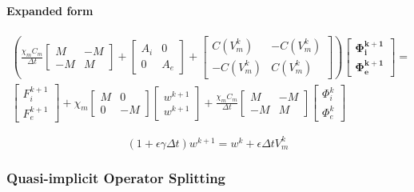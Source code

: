 \documentclass[a4paper]{article}
\begin{document}
\paragraph{Expanded form}
\begin{equation}
\begin{gathered}
\left( \frac{\chi_m C_m}{\Delta t} \begin{bmatrix} M & -M \\ -M & M \end{bmatrix} + \begin{bmatrix} A_i & 0 \\ 0 & A_e \end{bmatrix} + 
\begin{bmatrix}
C(V_m^k) & -C(V_m^k) \\ -C(V_m^k) & C(V_m^k)
\end{bmatrix}\right)
\begin{bmatrix} \bm{\Phi_i^{k+1}} \\ \bm{\Phi_e^{k+1}} \end{bmatrix} = 
\\
\begin{bmatrix} F_i^{k+1} \\ F_e^{k+1} \end{bmatrix} 
+ \chi_m \begin{bmatrix}M & 0 \\ 0 & -M \end{bmatrix}
\begin{bmatrix} w^{k+1} \\ w^{k+1} \end{bmatrix}
+ \frac{\chi_m C_m}{\Delta t} \begin{bmatrix}M & -M \\ -M & M\end{bmatrix}
\begin{bmatrix} \Phi_i^{k} \\ \Phi_e^{k} \end{bmatrix}
\end{gathered}
\end{equation}

\vspace{5mm}
\begin{equation}
(1+\epsilon \gamma \Delta t)w^{k+1} = w^k + \epsilon \Delta t V_m^k
\end{equation}

\newpage
\subsubsection{Quasi-implicit Operator Splitting}
\end{document}
